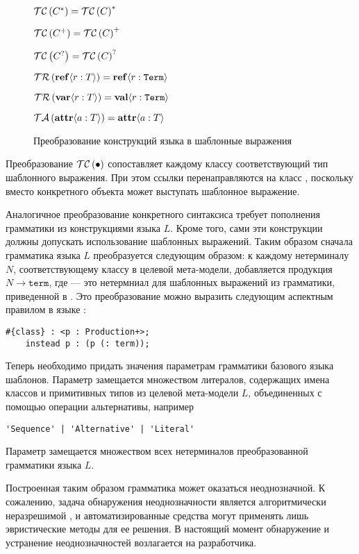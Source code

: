 {\begin{figure}[htbp]
$\mathcal{TC}\left(C^*\right) = \mathcal{TC}\left(C\right)^*$

$\mathcal{TC}\left(C^+\right) = \mathcal{TC}\left(C\right)^+$

$\mathcal{TC}\left(C^?\right) = \mathcal{TC}\left(C\right)^?$

$\mathcal{TR}\left(\mathbf{ref}\langle r : T\rangle\right) = \mathbf{ref}\langle r : \mathtt{Term}\rangle$

$\mathcal{TR}\left(\mathbf{var}\langle r : T\rangle\right) = \mathbf{val}\langle r : \mathtt{Term}\rangle$

$\mathcal{TA}\left(\mathbf{attr}\langle a : T\rangle\right) = \mathbf{attr}\langle a : T\rangle$
	\caption{Преобразование конструкций языка в шаблонные выражения}\label{TC}
\end{figure}

Преобразование $\mathcal{TC}\left(\bullet\right)$ сопоставляет каждому классу соответствующий тип шаблонного выражения. При этом ссылки перенаправляются на класс , поскольку вместо конкретного объекта может выступать шаблонное выражение.

Аналогичное преобразование конкретного синтаксиса требует пополнения грамматики из  конструкциями языка $L$. Кроме того, сами эти конструкции должны допускать использование шаблонных выражений. Таким образом сначала грамматика языка $L$ преобразуется следующим образом: к каждому нетерминалу $N$, соответствующему классу в целевой мета-модели, добавляется продукция $N \rightarrow \mathtt{term}$, где  --- это нетермниал для шаблонных выражений из грамматики, приведенной в . Это преобразование можно выразить следующим аспектным правилом в языке \GRM{}:
\begin{lstlisting}
#{class} : <p : Production+>;
	instead p : (p (: term));
\end{lstlisting}
Теперь необходимо придать значения параметрам грамматики базового языка шаблонов. Параметр  замещается множеством литералов, содержащих имена классов и примитивных типов из целевой мета-модели $L$, объединенных с помощью операции альтернативы, например
\begin{lstlisting}[language=Grammatic]
	'Sequence' | 'Alternative' | 'Literal'
\end{lstlisting}
Параметр  замещается множеством всех нетерминалов преобразованной грамматики языка $L$.

Построенная таким образом грамматика может оказаться неоднозначной. К сожалению, задача обнаружения неоднозначности является алгоритмически неразрешимой \cite{???}, и автоматизированные средства могут применять лишь эвристические методы для ее решения. В настоящий момент обнаружение и устранение неоднозначностей возлагается на разработчика.

}
